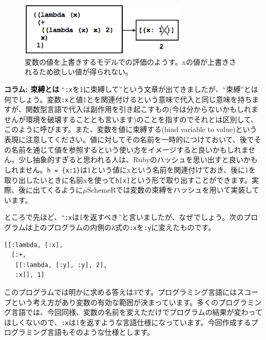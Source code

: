 \begin{figure}[htbp]
\begin{center}
\includegraphics[width=80mm]{images/environment1.eps}
\end{center}
\caption{変数の値を上書きするモデルでの評価のようす。xの値が上書きされるため欲しい値が得られない。}
\label{fig:environment1}
\end{figure}


\begin{breakitembox}[l]{\bf コラム: 束縛とは} 
“{\tt :x}を1に束縛して”という文章が出てきましたが、“束縛”とは何でしょう。変数{\tt :x}と値1とを関連付けるという意味で代入と同じ意味を持ちますが、関数型言語で代入は副作用を引き起こすもの(今は分からないかもしれませんが環境を破壊することとも言います)のことを指すのでそれとは区別して、このように呼びます。また、変数を値に束縛する(bind variable to value)という表現に注意してください。値に対してその名前を一時的につけておいて、後でその名前を通じて値を参照するという使い方をイメージすると良いかもしれません。少し抽象的すぎると思われる人は、Rubyのハッシュを思い出すと良いかもしれません。{\tt h = \{x:1\}}は1という値にxという名前を関連付けておき、後に1を取り出したいときに名前xを使って{\tt h[x]}という形で取り出すことができます。実際、後に出てくるように$\mu$SchemeRでは変数の束縛をハッシュを用いて実装しています。
\end{breakitembox}

ところで先ほど、“{\tt :x}は1を返すべき”と言いましたが、なぜでしょう。次のプログラムは上のプログラムの内側のλ式の{\tt :x}を{\tt :y}に変えたものです。

\begin{lstlisting}
[[:lambda, [:x],
  [:+, 
   [[:lambda, [:y], :y], 2],
   :x]], 1]
\end{lstlisting}

このプログラムでは明かに求める答えは3です。プログラミング言語にはスコープという考え方があり変数の有効な範囲が決まっています。多くのプログラミング言語では、今回同様、変数の名前を変えただけでプログラムの結果が変わってほしくないので、{\tt :x}は1を返すような言語仕様になっています。今回作成するプログラミング言語もそのような仕様とします。

